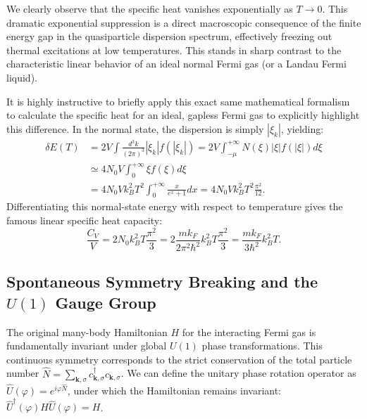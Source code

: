 We clearly observe that the specific heat vanishes exponentially as \( T \to 0 \). This dramatic exponential suppression is a direct macroscopic consequence of the finite energy gap in the quasiparticle dispersion spectrum, effectively freezing out thermal excitations at low temperatures. This stands in sharp contrast to the characteristic linear behavior of an ideal normal Fermi gas (or a Landau Fermi liquid).

It is highly instructive to briefly apply this exact same mathematical formalism to calculate the specific heat for an ideal, gapless Fermi gas to explicitly highlight this difference. In the normal state, the dispersion is simply \( |\xi_k| \), yielding:
\[
    \begin{aligned}
        \delta E(T) & = 2V \int \frac{d^3k}{(2\pi)^3} |\xi_k| f(|\xi_k|) = 2V \int_{-\mu}^{+\infty} N(\xi) |\xi| f(|\xi|) d\xi \\
                    & \simeq 4N_0 V \int_0^{+\infty} \xi f(\xi) d\xi                                                           \\
                    & = 4N_0 V k_B^2 T^2 \int_0^{+\infty} \frac{x}{e^x + 1} dx = 4N_0 V k_B^2 T^2 \frac{\pi^2}{12}.
    \end{aligned}
\]
Differentiating this normal-state energy with respect to temperature gives the famous linear specific heat capacity:
\[
    \frac{C_V}{V} = 2N_0 k_B^2 T \frac{\pi^2}{3} = 2\frac{m k_F}{2\pi^2\hbar^2} k_B^2 T \frac{\pi^2}{3} = \frac{m k_F}{3\hbar^2} k_B^2 T.
\]

\subsection{Spontaneous Symmetry Breaking and the \( U(1) \) Gauge Group}

The original many-body Hamiltonian \( H \) for the interacting Fermi gas is fundamentally invariant under global \( U(1) \) phase transformations. This continuous symmetry corresponds to the strict conservation of the total particle number \( \hat{N} = \sum_{\mathbf{k},\sigma} c_{\mathbf{k},\sigma}^\dagger c_{\mathbf{k},\sigma} \). We can define the unitary phase rotation operator as \( \hat{U}(\varphi) = e^{i\varphi \hat{N}} \), under which the Hamiltonian remains invariant: \( \hat{U}^\dagger(\varphi) H \hat{U}(\varphi) = H \).

